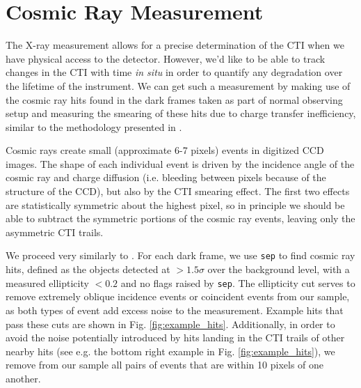 \section{Cosmic Ray Measurement}
The X-ray measurement allows for a precise determination of the CTI when we have physical access to the detector. However, we'd like to be able to track changes in the CTI with time \emph{in situ} in order to quantify any degradation over the lifetime of the instrument. We can get such a measurement by making use of the cosmic ray hits found in the dark frames taken as part of normal observing setup and measuring the smearing of these hits due to charge transfer inefficiency, similar to the methodology presented in \cite{riess_time_1999}.

Cosmic rays create small (approximate 6-7 pixels) events in digitized CCD images. The shape of each individual event is driven by the incidence angle of the cosmic ray and charge diffusion (i.e. bleeding between pixels because of the structure of the CCD), but also by the CTI smearing effect. The first two effects are statistically symmetric about the highest pixel, so in principle we should be able to subtract the symmetric portions of the cosmic ray events, leaving only the asymmetric CTI trails.

We proceed very similarly to \cite{riess_time_1999}. For each dark frame, we use \verb|sep| to find cosmic ray hits, defined as the objects detected at $>1.5\sigma$ over the background level, with a measured ellipticity $< 0.2$ and no flags raised by \verb|sep|. The ellipticity cut serves to remove extremely oblique incidence events or coincident events from our sample, as both types of event add excess noise to the measurement. Example hits that pass these cuts are shown in Fig. \ref{fig:example_hits}. Additionally, in order to avoid the noise potentially introduced by hits landing in the CTI trails of other nearby hits (see e.g. the bottom right example in Fig. \ref{fig:example_hits}), we remove from our sample all pairs of events that are within 10 pixels of one another.

